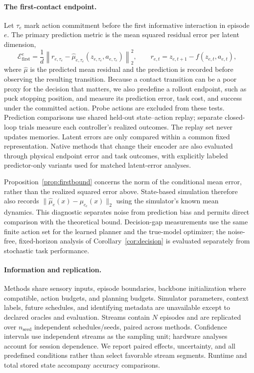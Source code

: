 \paragraph{The first-contact endpoint.}
Let $\tau_e$ mark action commitment before the first informative interaction in episode $e$. The primary prediction metric is the mean squared residual error per latent dimension,
\begin{equation}
 \mathcal{E}_{\mathrm{first}}^e
 =\frac{1}{d}\left\|r_{e,\tau_e}
 -\widehat\mu_{e,\tau_e}(z_{e,\tau_e},a_{e,\tau_e})\right\|_2^2,
 \qquad r_{e,t}=z_{e,t+1}-f(z_{e,t},a_{e,t}),
\end{equation}
where $\widehat\mu$ is the predicted mean residual and the prediction is recorded before observing the resulting transition. Because a contact transition can be a poor proxy for the decision that matters, we also predefine a rollout endpoint, such as puck stopping position, and measure its prediction error, task cost, and success under the committed action. Probe actions are excluded from these tests. Prediction comparisons use shared held-out state--action replay; separate closed-loop trials measure each controller's realized outcomes. The replay set never updates memories. Latent errors are only compared within a common fixed representation. Native methods that change their encoder are also evaluated through physical endpoint error and task outcomes, with explicitly labeled predictor-only variants used for matched latent-error analyses.

Proposition~\ref{prop:firstbound} concerns the norm of the conditional mean error, rather than the realized squared error above. State-based simulation therefore also records $\|\widehat\mu_e(x)-\mu_{c_e}(x)\|_2$ using the simulator's known mean dynamics. This diagnostic separates noise from prediction bias and permits direct comparison with the theoretical bound. Decision-gap measurements use the same finite action set for the learned planner and the true-model optimizer; the noise-free, fixed-horizon analysis of Corollary~\ref{cor:decision} is evaluated separately from stochastic task performance.

\paragraph{Information and replication.}
Methods share sensory inputs, episode boundaries, backbone initialization where compatible, action budgets, and planning budgets. Simulator parameters, context labels, future schedules, and identifying metadata are unavailable except to declared oracles and evaluation. Streams contain $N$ episodes and are replicated over $n_{\mathrm{seed}}$ independent schedules/seeds, paired across methods. Confidence intervals use independent streams as the sampling unit; hardware analyses account for session dependence. We report paired effects, uncertainty, and all predefined conditions rather than select favorable stream segments. Runtime and total stored state accompany accuracy comparisons.

